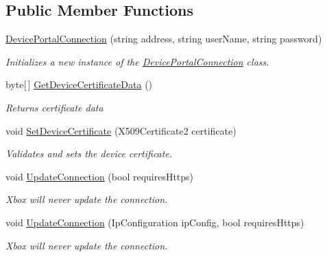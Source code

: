 \subsection*{Public Member Functions}
\begin{DoxyCompactItemize}
\item 
\hyperlink{class_xbox_wdp_driver_1_1_device_portal_connection_aa5feebdb5e8109ac6402482d09594d7b}{Device\+Portal\+Connection} (string address, string user\+Name, string password)
\begin{DoxyCompactList}\small\item\em Initializes a new instance of the \hyperlink{class_xbox_wdp_driver_1_1_device_portal_connection}{Device\+Portal\+Connection} class. \end{DoxyCompactList}\item 
byte\mbox{[}$\,$\mbox{]} \hyperlink{class_xbox_wdp_driver_1_1_device_portal_connection_ae5b498e62e5a0b2c701c039e66764f3c}{Get\+Device\+Certificate\+Data} ()
\begin{DoxyCompactList}\small\item\em Returns certificate data \end{DoxyCompactList}\item 
void \hyperlink{class_xbox_wdp_driver_1_1_device_portal_connection_a3cbb2f4486f137c4203c60c87a2786dd}{Set\+Device\+Certificate} (X509\+Certificate2 certificate)
\begin{DoxyCompactList}\small\item\em Validates and sets the device certificate. \end{DoxyCompactList}\item 
void \hyperlink{class_xbox_wdp_driver_1_1_device_portal_connection_a8dc6d6d8e27f4a06b74d3fa1fb06b367}{Update\+Connection} (bool requires\+Https)
\begin{DoxyCompactList}\small\item\em Xbox will never update the connection. \end{DoxyCompactList}\item 
void \hyperlink{class_xbox_wdp_driver_1_1_device_portal_connection_a77dc3f998c35b885d1fc7a6fc843db03}{Update\+Connection} (Ip\+Configuration ip\+Config, bool requires\+Https)
\begin{DoxyCompactList}\small\item\em Xbox will never update the connection. \end{DoxyCompactList}\end{DoxyCompactItemize}
